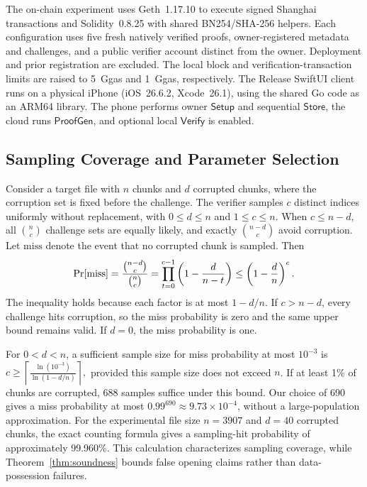 \documentclass[lettersize,journal]{IEEEtran}
\newcommand{\Setup}{\ensuremath{\mathsf{Setup}}}
\newcommand{\Store}{\ensuremath{\mathsf{Store}}}
\newcommand{\ProofGen}{\ensuremath{\mathsf{ProofGen}}}
\newcommand{\Verify}{\ensuremath{\mathsf{Verify}}}
\begin{document}
The on-chain experiment uses Geth~1.17.10 to execute signed Shanghai transactions and Solidity~0.8.25 with shared BN254/SHA-256 helpers. Each configuration uses five fresh natively verified proofs, owner-registered metadata and challenges, and a public verifier account distinct from the owner. Deployment and prior registration are excluded. The local block and verification-transaction limits are raised to 5~Ggas and 1~Ggas, respectively.
The Release SwiftUI client runs on a physical iPhone (iOS~26.6.2, Xcode~26.1), using the shared Go code as an ARM64 library. The phone performs owner \Setup{} and sequential \Store{}, the cloud runs \ProofGen{}, and optional local \Verify{} is enabled. 

\subsection{Sampling Coverage and Parameter Selection}
\label{subsec:sampling_coverage}
Consider a target file with $n$ chunks and $d$ corrupted chunks, where the corruption set is fixed before the challenge. The verifier samples $c$ distinct indices uniformly without replacement, with $0\leq d\leq n$ and $1\leq c\leq n$. When $c\leq n-d$, all $\binom nc$ challenge sets are equally likely, and exactly $\binom{n-d}{c}$ avoid corruption. Let $\mathrm{miss}$ denote the event that no corrupted chunk is sampled. Then
\begin{equation}
\begin{aligned}
\Pr[\mathrm{miss}]
=\frac{\binom{n-d}{c}}{\binom nc}
=\prod_{t=0}^{c-1}\left(1-\frac{d}{n-t}\right)\leq\left(1-\frac dn\right)^c.
\end{aligned}\notag
\end{equation}
The inequality holds because each factor is at most $1-d/n$. If $c>n-d$, every challenge hits corruption, so the miss probability is zero and the same upper bound remains valid. If $d=0$, the miss probability is one.

For $0<d<n$, a sufficient sample size for miss probability at most $10^{-3}$ is $c\geq\left\lceil\frac{\ln(10^{-3})}{\ln(1-d/n)}\right\rceil,$
provided this sample size does not exceed $n$. If at least 1\% of chunks are corrupted, 688 samples suffice under this bound. Our choice of 690 gives a miss probability at most $0.99^{690}\approx9.73\times10^{-4}$, without a large-population approximation. For the experimental file size $n=3907$ and $d=40$ corrupted chunks, the exact counting formula gives a sampling-hit probability of approximately 99.960\%.
This calculation characterizes sampling coverage, while Theorem~\ref{thm:soundness} bounds false opening claims rather than data-possession failures.
\end{document}
